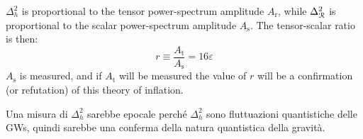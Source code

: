 $ \Delta^2_h $ is proportional to the tensor power-spectrum amplitude $ A_\text{r} $, while $ \Delta^2_\EuScript{R} $ is proportional to the scalar power-spectrum amplitude $ A_\text{s} $. The tensor-scalar ratio is then:
\begin{equation}
  r \equiv \frac{A_\text{t}}{A_\text{s}} = 16 \varepsilon
\end{equation}
$ A_\text{s} $ is measured, and if $ A_\text{t} $ will be measured the value of $ r $ will be a confirmation (or refutation) of this theory of inflation.

Una misura di $ \Delta^2_h $ sarebbe epocale perché $ \Delta^2_h $ sono fluttuazioni quantistiche delle GWs, quindi sarebbe una conferma della natura quantistica della gravità.








 
